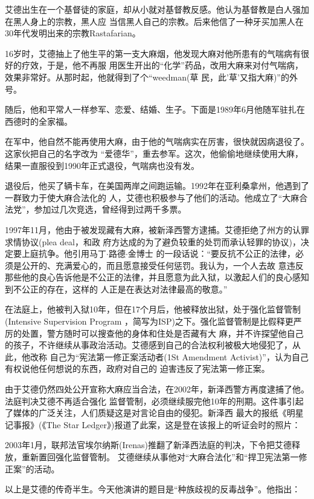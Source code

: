 ﻿\documentclass[11pt]{article}
\begin{document}
艾德出生在一个基督徒的家庭，却从小就对基督教反感。他认为基督教是白人强加在黑人身上的宗教，黑人应
当信黑人自己的宗教。后来他信了一种牙买加黑人在30年代发明出来的宗教Rastafarian。

16岁时，艾德抽上了他生平的第一支大麻烟，他发现大麻对他所患有的气喘病有很好的疗效，于是，他不再服
用医生开出的``化学''药品，改用大麻来对付气喘病，效果非常好。从那时起，他就得到了个``weedman(草
民，此'草'又指大麻)''的外号。

随后，他和平常人一样参军、恋爱、结婚、生子。下面是1989年6月他随军驻扎在西德时的全家福。

在军中，他自然不能再使用大麻，由于他的气喘病实在厉害，很快就因病退役了。这家伙把自己的名字改为
``爱德华''，重去参军。这次，他偷偷地继续使用大麻，结果一直服役到1990年正式退役，气喘病也没有发。

退役后，他买了辆卡车，在美国两岸之间跑运输。1992年在亚利桑拿州，他遇到了一群致力于使大麻合法化的
人，艾德也积极参与了他们的活动。他成立了``大麻合法党''，参加过几次竞选，曾经得到过两千多票。

1997年11月，他由于被发现藏有大麻，被新泽西警方逮捕。艾德拒绝了州方的认罪求情协议(plea deal，和政
府方达成的为了避负较重的处罚而承认轻罪的协议)，决定要上庭抗争。他引用马丁$\cdot$路德$\cdot$金博士
的一段话说：``要反抗不公正的法律，必须是公开的、充满爱心的，而且愿意接受任何惩罚。我认为，一个人去故
意违反那些他的良心告诉他是不公正的法律，并且愿意为此入狱，以激起人们的良心感知到不公正的存在，这样的
人正是在表达对法律最高的敬意。''

在法庭上，他被判入狱10年，但在17个月后，他被释放出狱，处于强化监督管制(Intensive Supervision
Program ，简写为ISP)之下。强化监督管制是比假释更严厉的处置，警方随时可以搜查他的身体和住处是否藏有大
麻，并不许探望他自己的孩子，不许继续从事政治活动。艾德感到自己的合法权利被极大地侵犯了，从此，他改称
自己为``宪法第一修正案活动者(1St Amendment Activist)''，认为自己有权说他任何想说的东西，政府对自己的
迫害违反了宪法第一修正案。

由于艾德仍然四处公开宣称大麻应当合法，在2002年，新泽西警方再度逮捕了他。法庭判决艾德不再适合强化
监督管制，必须继续服完他10年的刑期。这件事引起了媒体的广泛关注，人们质疑这是对言论自由的侵犯。新泽西
最大的报纸《明星记事报》(《The Star Ledger》)报道了此案，这是登在该报上的听证会时的照片：

2003年1月，联邦法官埃尔纳斯(Irenas)推翻了新泽西法庭的判决，下令把艾德释放，重新置回强化监督管制。
艾德继续从事他对``大麻合法化''和``捍卫宪法第一修正案''的活动。

以上是艾德的传奇半生。今天他演讲的题目是``种族歧视的反毒战争''。他指出：
\end{document}
